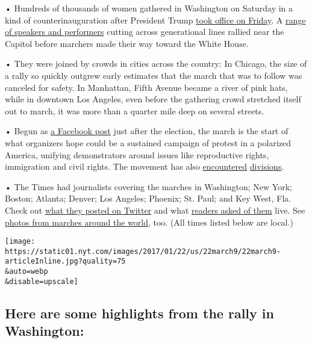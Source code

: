 • Hundreds of thousands of women gathered in Washington on Saturday in a
kind of counterinauguration after President Trump
\href{https://www.nytimes.com/2017/01/20/us/politics/trump-inauguration-day.html}{took
office on Friday}. A \href{https://www.womensmarch.com/speakers/}{range
of speakers and performers} cutting across generational lines rallied
near the Capitol before marchers made their way toward the White House.

• They were joined by crowds in cities across the country: In Chicago,
the size of a rally so quickly outgrew early estimates that the march
that was to follow was canceled for safety. In Manhattan, Fifth Avenue
became a river of pink hats, while in downtown Los Angeles, even before
the gathering crowd stretched itself out to march, it was more than a
quarter mile deep on several streets.

• Begun as \href{https://www.facebook.com/events/2169332969958991/}{a
Facebook post} just after the election, the march is the start of what
organizers hope could be a sustained campaign of protest in a polarized
America, unifying demonstrators around issues like reproductive rights,
immigration and civil rights. The movement has also
\href{https://www.nytimes.com/2017/01/09/us/womens-march-on-washington-opens-contentious-dialogues-about-race.html?_r=0}{encountered}
\href{https://www.nytimes.com/2017/01/18/us/womens-march-abortion.html}{divisions}.

• The Times had journalists covering the marches in Washington; New
York; Boston; Atlanta; Denver; Los Angeles; Phoenix; St. Paul; and Key
West, Fla. Check out
\href{https://twitter.com/NYTNational/lists/women-s-march}{what they
posted on Twitter} and what
\href{https://www.nytimes.com/interactive/2017/01/21/us/questions-march-live.html}{readers
asked of them} live. See
\href{https://www.nytimes.com/interactive/2017/01/21/world/womens-march-pictures.html}{photos
from marches around the world}, too. (All times listed below are local.)

\texttt{[image: https://static01.nyt.com/images/2017/01/22/us/22march9/22march9-articleInline.jpg?quality=75\\\&auto=webp\\\&disable=upscale]}

\hypertarget{here-are-some-highlights-from-the-rally-in-washington}{%
\subsection{Here are some highlights from the rally in
Washington:}\label{here-are-some-highlights-from-the-rally-in-washington}}

